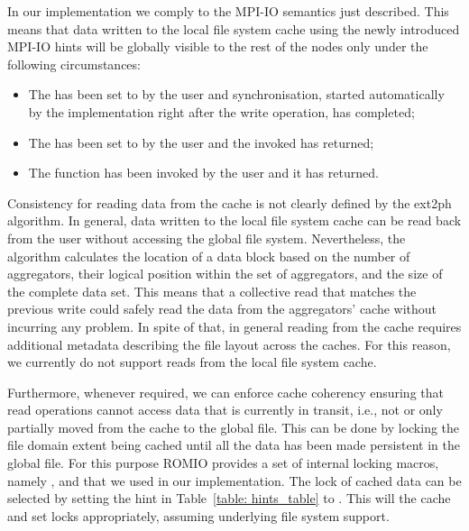 In our implementation we comply to the MPI-IO semantics just described. This means that data written to the local file system cache using the newly introduced MPI-IO hints will be globally visible to the rest of the nodes only under the following circumstances:
\begin{itemize}
\item The  has been set to  by the user and synchronisation, started automatically by the implementation right after the write operation, has completed;
\item The  has been set to  by the user and the invoked  has returned;
\item The  function has been invoked by the user and it has returned.
\end{itemize}

Consistency for reading data from the cache is not clearly defined by the ext2ph algorithm. In general, data written to the local file system cache can be read back from the user without accessing the global file system. Nevertheless, the algorithm calculates the location of a data block based on the number of aggregators, their logical position within the set of aggregators, and the size of the complete data set. This means that a collective read that matches the previous write could safely read the data from the aggregators' cache without incurring any problem. In spite of that, in general reading from the cache requires additional metadata describing the file layout across the caches. For this reason, we currently do not support reads from the local file system cache.

Furthermore, whenever required, we can enforce cache coherency ensuring that read operations cannot access data that is currently in transit, i.e., not or only partially moved from the cache to the global file. This can be done by locking the file domain extent being cached until all the data has been made persistent in the global file. For this purpose ROMIO provides a set of internal locking macros, namely ,  and  that we used in our implementation. The lock of cached data can be selected by setting the  hint in Table~\ref{table: hints_table} to . This will  the cache and set locks appropriately, assuming underlying file system support.

